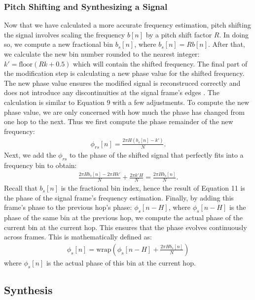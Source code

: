 \documentclass[12pt]{article}
\begin{document}
\subsubsection{Pitch Shifting and Synthesizing a Signal}
Now that we have calculated a more accurate frequency estimation, pitch shifting the signal 
involves scaling the frequency $b[n]$ by a pitch shift factor $R$. In doing so, we compute a new fractional
bin $b_s[n]$, where $b_s[n] = Rb[n]$. After that,  we calculate the new bin number rounded to the nearest integer: $k' = \text{floor}(Rk + 0.5)$ 
which will contain the shifted frequency. 
The final part of the modification step is calculating a new phase value for the shifted frequency. The new phase 
value ensures the modified signal is reconstruced correctly and does not introduce any discontinuities at the signal
frame's edges \cite{barry2008time}. The calculation is similar to Equation 9 with a few adjustments. To compute the new phase
value, we are only concerned with how much the phase has changed from one hop to the next. Thus we first compute the phase
remainder of the new frequency: 
\begin{align}
  \phi_{rs}[n] = \frac{2\pi H(b_s[n] - k')}{N}.
\end{align}
Next, we add the $\phi_{rs}$ to the phase of the shifted signal that perfectly fits into a frequency bin to obtain: 
\begin{align}
 \frac{2\pi Hb_s[n] - 2\pi H k'}{N}  + \frac{2\pi k' H}{N} = \frac{2\pi H b_s[n]}{N}.
\end{align}
Recall that $b_s[n]$ is the fractional bin index, hence the result of Equation 11 is the phase of the signal frame's frequency estimation. 
Finally, by adding this frame's phase to the previous hop's phase: $\phi_s[n-H]$, where $\phi_s[n-H]$ is the phase of the same bin at the previous hop, we compute the actual phase of 
the current bin at the current hop. This ensures that the phase evolves continuously across frames. 
This is mathematically defined as: 
\begin{align}
  \phi_s[n] = \text{wrap}\left(\phi_s[n-H] + \frac{2\pi H b_s[n]}{N}\right)
\end{align}
where $\phi_s[n]$ is the actual phase of this bin at the current hop.  


\subsection{Synthesis}
\end{document}
